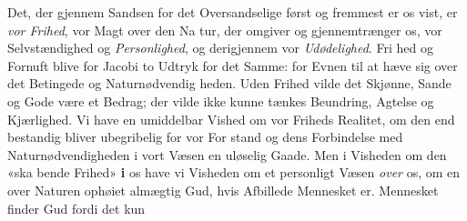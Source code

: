 \documentclass[12pt,a4paper]{book}
\begin{document}
Det, der gjennem Sandsen for det Oversandselige først og
fremmest er os vist, er \emph{vor Frihed}, vor Magt over den Na\-%
tur, der omgiver og gjennemtrænger os, vor Selvstændighed
og \emph{Personlighed}, og derigjennem vor \emph{Udødelighed}. Fri\-%
hed og Fornuft blive for Jacobi to Udtryk for det Samme: for
Evnen til at hæve sig over det Betingede og Naturnødvendig\-%
heden. Uden Frihed vilde det Skjønne, Sande og Gode være
et Bedrag; der vilde ikke kunne tænkes Beundring, Agtelse og
Kjærlighed. Vi have en umiddelbar Vished om vor Friheds
Realitet, om den end bestandig bliver ubegribelig for vor For\-%
stand og dens Forbindelse med Naturnødvendigheden i vort
Væsen en uløselig Gaade. Men i Visheden om den «ska\-%
bende Frihed» \textbf{i} os have vi Visheden om et personligt Væsen
\emph{over} os, om en over Naturen ophøiet almægtig Gud, hvis
Afbillede Mennesket er. Mennesket finder Gud fordi det kun
\end{document}
